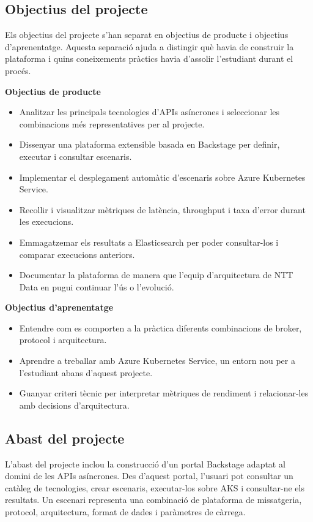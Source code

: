 \documentclass[11pt,a4paper]{article}
\begin{document}
\subsection{Objectius del projecte}
Els objectius del projecte s'han separat en objectius de producte i objectius d'aprenentatge. Aquesta separaci\'o ajuda a distingir qu\`e havia de construir la plataforma i quins coneixements pr\`actics havia d'assolir l'estudiant durant el proc\'es.

\textbf{Objectius de producte}
\begin{itemize}
  \item Analitzar les principals tecnologies d'APIs as\'incrones i seleccionar les combinacions m\'es representatives per al projecte.
  \item Dissenyar una plataforma extensible basada en Backstage per definir, executar i consultar escenaris.
  \item Implementar el desplegament autom\`atic d'escenaris sobre Azure Kubernetes Service.
  \item Recollir i visualitzar m\`etriques de lat\`encia, throughput i taxa d'error durant les execucions.
  \item Emmagatzemar els resultats a Elasticsearch per poder consultar-los i comparar execucions anteriors.
  \item Documentar la plataforma de manera que l'equip d'arquitectura de NTT Data en pugui continuar l'\'us o l'evoluci\'o.
\end{itemize}

\textbf{Objectius d'aprenentatge}
\begin{itemize}
  \item Entendre com es comporten a la pr\`actica diferents combinacions de broker, protocol i arquitectura.
  \item Aprendre a treballar amb Azure Kubernetes Service, un entorn nou per a l'estudiant abans d'aquest projecte.
  \item Guanyar criteri t\`ecnic per interpretar m\`etriques de rendiment i relacionar-les amb decisions d'arquitectura.
\end{itemize}

\subsection{Abast del projecte}
L'abast del projecte inclou la construcci\'o d'un portal Backstage adaptat al domini de les APIs as\'incrones. Des d'aquest portal, l'usuari pot consultar un cat\`aleg de tecnologies, crear escenaris, executar-los sobre AKS i consultar-ne els resultats. Un escenari representa una combinaci\'o de plataforma de missatgeria, protocol, arquitectura, format de dades i par\`ametres de c\`arrega.
\end{document}
